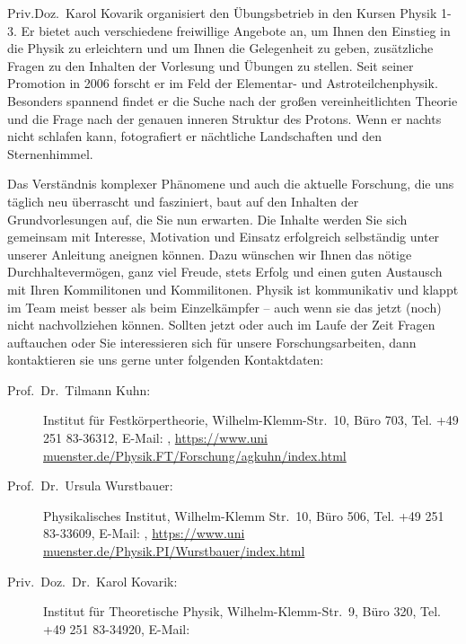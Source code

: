 \begin{multicols}{2}
Priv.\-Doz.\ Karol Kovarik organisiert den Übungsbetrieb in den Kursen Physik 1-3. Er bietet auch 
verschiedene freiwillige Angebote an, um Ihnen den Einstieg in die Physik zu erleichtern und um Ihnen 
die Gelegenheit zu geben, zusätzliche Fragen zu den Inhalten der Vorlesung und Übungen zu stellen. 
Seit seiner Promotion in 2006 forscht er im Feld der Elementar- und Astroteilchenphysik. Besonders 
spannend findet er die Suche nach der großen vereinheitlichten Theorie und die Frage nach der 
genauen inneren Struktur des Protons. Wenn er nachts nicht schlafen kann, fotografiert er nächtliche 
Landschaften und den Sternenhimmel. 

Das Verständnis komplexer Phänomene und auch die aktuelle Forschung, die uns täglich neu 
überrascht und fasziniert, baut auf den Inhalten der Grundvorlesungen auf, die Sie nun erwarten. Die 
Inhalte werden Sie sich gemeinsam mit Interesse, Motivation und Einsatz erfolgreich selbständig unter 
unserer Anleitung aneignen können. Dazu wünschen wir Ihnen das nötige Durchhaltevermögen, ganz 
viel Freude, stets Erfolg und einen guten Austausch mit Ihren Kommilitonen und Kommilitonen. Physik 
ist kommunikativ und klappt im Team meist besser als beim Einzelkämpfer – auch wenn sie das jetzt (noch) 
nicht nachvollziehen können. Sollten jetzt oder auch im Laufe der Zeit Fragen auftauchen oder Sie 
interessieren sich für unsere Forschungsarbeiten, dann kontaktieren sie uns gerne unter folgenden 
Kontaktdaten: 

\begin{description}
	\item[Prof.\ Dr.\ Tilmann Kuhn:] Institut für Festkörpertheorie, Wilhelm-Klemm-Str.\ 10, Büro 703, Tel. +49 
		251 83-36312, E-Mail: , \url{https://www.uni
		muenster.de/Physik.FT/Forschung/agkuhn/index.html}

	\item[Prof.\ Dr.\ Ursula Wurstbauer:] Physikalisches Institut, Wilhelm-Klemm Str.\ 10, Büro 506, Tel. +49 251 
		83-33609, E-Mail: , \url{https://www.uni
		muenster.de/Physik.PI/Wurstbauer/index.html}

	\item[Priv.\ Doz.\ Dr.\ Karol Kovarik:] Institut für Theoretische Physik, Wilhelm-Klemm-Str.\ 9, Büro 320, Tel. 
+49 251 83-34920, E-Mail: 
\end{description}


\end{multicols}
